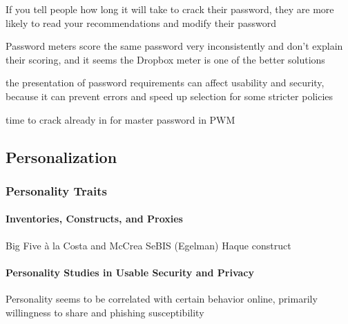 	If you tell people how long it will take to crack their password, they are more likely to read your recommendations and modify their password \cite{Vance2013FearAppeals}
	
	Password meters score the same password very inconsistently and don't explain their scoring, and it seems the Dropbox meter is one of the better solutions \cite{Carnavalet2014AnalyzingPWStrengthMeters}
	
	the presentation of password requirements can affect usability and security, because it can prevent errors and speed up selection for some stricter policies \cite{Shay2015SpoonfulOfSugar}
	
	time to crack already in \cite{Yee2006Passpet} for master password in PWM
	
	\subsection{Personalization}
	\subsubsection{Personality Traits}
	\paragraph{Inventories, Constructs, and Proxies}
	Big Five à la Costa and McCrea \cite{Costa1992NEO}
	SeBIS (Egelman)
	Haque construct \cite{Haque2014PsychometricsStrongPassword}
	\paragraph{Personality Studies in Usable Security and Privacy}
		
	
	Personality seems to be correlated with certain behavior online, primarily willingness to share and phishing susceptibility \cite{Halevi2013PilotStudyPersonality}
	
	
	
